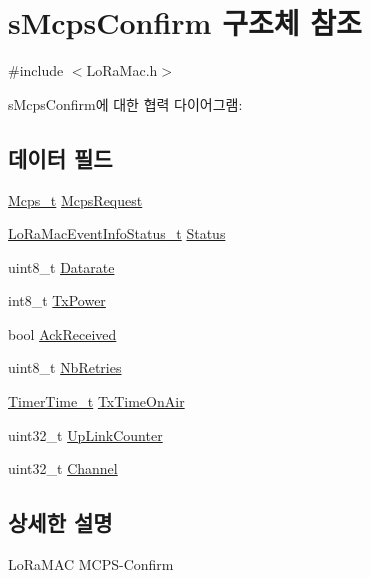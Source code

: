\hypertarget{structs_mcps_confirm}{}\section{s\+Mcps\+Confirm 구조체 참조}
\label{structs_mcps_confirm}


{\ttfamily \#include $<$Lo\+Ra\+Mac.\+h$>$}



s\+Mcps\+Confirm에 대한 협력 다이어그램\+:
\subsection*{데이터 필드}
\begin{DoxyCompactItemize}
\item 
\mbox{\hyperlink{group___l_o_r_a_m_a_c_ga670d0c87a52aeb13391f303a4cf94f00}{Mcps\+\_\+t}} \mbox{\hyperlink{structs_mcps_confirm_ab5da7b8ef4530ebd1fb2005f950a2b0b}{Mcps\+Request}}
\item 
\mbox{\hyperlink{group___l_o_r_a_m_a_c_gac6ffc346a4c767f7a743c87a686c51b4}{Lo\+Ra\+Mac\+Event\+Info\+Status\+\_\+t}} \mbox{\hyperlink{structs_mcps_confirm_ab360e499d5a7a9e0aa7b4df7239633b5}{Status}}
\item 
uint8\+\_\+t \mbox{\hyperlink{structs_mcps_confirm_a780280c12645b2666878162aab5d8cad}{Datarate}}
\item 
int8\+\_\+t \mbox{\hyperlink{structs_mcps_confirm_a037b4f849fa8ed4aa1d3c58aef2b28ec}{Tx\+Power}}
\item 
bool \mbox{\hyperlink{structs_mcps_confirm_ac59e1bd1c9450c7d136c7f475be89ded}{Ack\+Received}}
\item 
uint8\+\_\+t \mbox{\hyperlink{structs_mcps_confirm_a87c781229ed6a79169564bbed6581f29}{Nb\+Retries}}
\item 
\mbox{\hyperlink{utilities_8h_a4215ca43d3e953099ea758ce428599d0}{Timer\+Time\+\_\+t}} \mbox{\hyperlink{structs_mcps_confirm_aa17a8607485db100d315e74853dd217e}{Tx\+Time\+On\+Air}}
\item 
uint32\+\_\+t \mbox{\hyperlink{structs_mcps_confirm_ae8c54ca277e4d7295dfd498889e42fdd}{Up\+Link\+Counter}}
\item 
uint32\+\_\+t \mbox{\hyperlink{structs_mcps_confirm_ae82bf9242a014164f9f6907f29782c44}{Channel}}
\end{DoxyCompactItemize}


\subsection{상세한 설명}
Lo\+Ra\+M\+AC M\+C\+P\+S-\/\+Confirm 

